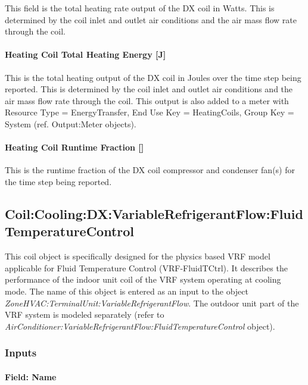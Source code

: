 This field is the total heating rate output of the DX coil in Watts. This is determined by the coil inlet and outlet air conditions and the air mass flow rate through the coil.

\paragraph{Heating Coil Total Heating Energy {[}J{]}}\label{heating-coil-total-heating-energy-j}

This is the total heating output of the DX coil in Joules over the time step being reported. This is determined by the coil inlet and outlet air conditions and the air mass flow rate through the coil. This output is also added to a meter with Resource Type = EnergyTransfer, End Use Key = HeatingCoils, Group Key = System (ref. Output:Meter objects).

\paragraph{Heating Coil Runtime Fraction {[]}}\label{heating-coil-runtime-fraction-1}

This is the runtime fraction of the DX coil compressor and condenser fan(s) for the time step being reported.

\subsection{Coil:Cooling:DX:VariableRefrigerantFlow:FluidTemperatureControl}\label{coilcoolingdxvariablerefrigerantflowfluidtemperaturecontrol}

This coil object is specifically designed for the physics based VRF model applicable for Fluid Temperature Control (VRF-FluidTCtrl). It describes the performance of the indoor unit coil of the VRF system operating at cooling mode. The name of this object is entered as an input to the object \emph{ZoneHVAC:TerminalUnit:VariableRefrigerantFlow}. The outdoor unit part of the VRF system is modeled separately (refer to \emph{AirConditioner:VariableRefrigerantFlow:FluidTemperatureControl} object).

\subsubsection{Inputs}\label{inputs-8-008}

\paragraph{Field: Name}\label{field-name-7-006}

